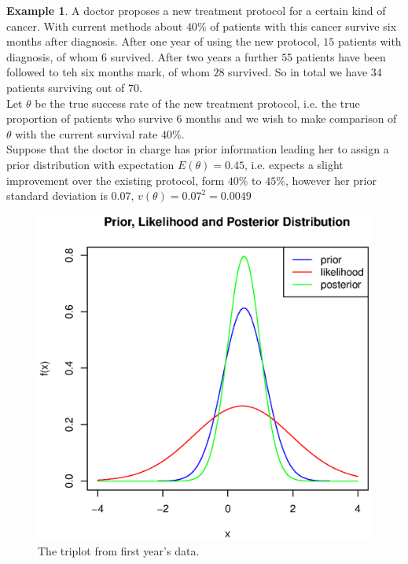 \documentclass[lecture,12pt,]{pcms-l}
\numberwithin{section}{chapter}
\numberwithin{equation}{chapter}
\theoremstyle{plain}
\theoremstyle{definition}
\newtheorem{example}{Example}[section]
\theoremstyle{definition}
\begin{document}
\begin{example}
A doctor proposes a new treatment protocol for a certain kind of cancer. With current methods about $40 \%$ of patients with this cancer survive six months after diagnosis. After one year of using the new protocol, $15$ patients with diagnosis, of whom $6$ survived. After two years a further $55$ patients have been followed to teh six months mark, of whom $28$ survived. So in total we have $34$ patients surviving out of $70$.
\\
Let $\theta$ be the true success rate of the new treatment protocol, i.e. the true proportion of patients who survive $6$ months and we wish to make comparison of $\theta$ with the current survival rate $40\%$.
\\
Suppose that the doctor in charge has prior information leading her to assign a prior distribution with expectation $E(\theta)=0.45$, i.e. expects a slight improvement over the existing protocol, form $40\%$ to $45\%$, however her prior standard deviation is $0.07$, $v(\theta)=0.07^2=0.0049$
\end{example}

\begin{figure}
\centering
 \includegraphics[scale=0.6]{triplot_v1}%
  \caption{The triplot from first year's data. }
\label{fig:FirstTriplot}
\end{figure} 
\end{document}
